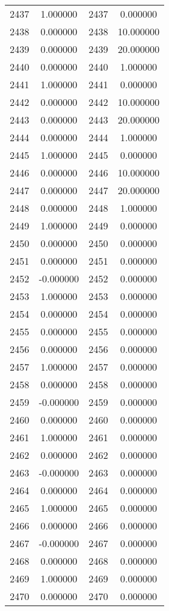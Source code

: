 \documentclass[12pt]{article}
\begin{document}
\begin{longtable}{@{}cccc@{}}
2437 & 1.000000 & 2437 & 0.000000 \\
2438 & 0.000000 & 2438 & 10.000000 \\
2439 & 0.000000 & 2439 & 20.000000 \\
2440 & 0.000000 & 2440 & 1.000000 \\
2441 & 1.000000 & 2441 & 0.000000 \\
2442 & 0.000000 & 2442 & 10.000000 \\
2443 & 0.000000 & 2443 & 20.000000 \\
2444 & 0.000000 & 2444 & 1.000000 \\
2445 & 1.000000 & 2445 & 0.000000 \\
2446 & 0.000000 & 2446 & 10.000000 \\
2447 & 0.000000 & 2447 & 20.000000 \\
2448 & 0.000000 & 2448 & 1.000000 \\
2449 & 1.000000 & 2449 & 0.000000 \\
2450 & 0.000000 & 2450 & 0.000000 \\
2451 & 0.000000 & 2451 & 0.000000 \\
2452 & -0.000000 & 2452 & 0.000000 \\
2453 & 1.000000 & 2453 & 0.000000 \\
2454 & 0.000000 & 2454 & 0.000000 \\
2455 & 0.000000 & 2455 & 0.000000 \\
2456 & 0.000000 & 2456 & 0.000000 \\
2457 & 1.000000 & 2457 & 0.000000 \\
2458 & 0.000000 & 2458 & 0.000000 \\
2459 & -0.000000 & 2459 & 0.000000 \\
2460 & 0.000000 & 2460 & 0.000000 \\
2461 & 1.000000 & 2461 & 0.000000 \\
2462 & 0.000000 & 2462 & 0.000000 \\
2463 & -0.000000 & 2463 & 0.000000 \\
2464 & 0.000000 & 2464 & 0.000000 \\
2465 & 1.000000 & 2465 & 0.000000 \\
2466 & 0.000000 & 2466 & 0.000000 \\
2467 & -0.000000 & 2467 & 0.000000 \\
2468 & 0.000000 & 2468 & 0.000000 \\
2469 & 1.000000 & 2469 & 0.000000 \\
2470 & 0.000000 & 2470 & 0.000000 \\

\end{longtable}
\end{document}
